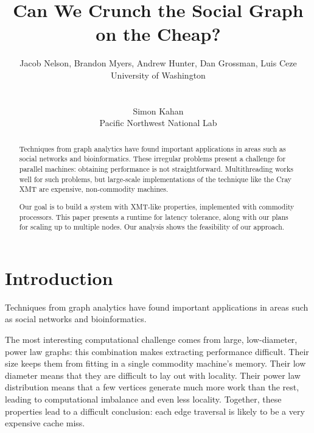 \documentclass{acm_proc_article-sp}
\begin{document}
\title{Can We Crunch the Social Graph on the Cheap?}

\author{
Jacob Nelson, Brandon Myers, Andrew Hunter, Dan Grossman, Luis Ceze\\
University of Washington\\
\\ \\
Simon Kahan \\ 
Pacific Northwest National Lab\\
}

\maketitle
\begin{abstract}

 Techniques from graph analytics have found important applications in
  areas such as social networks and bioinformatics. These irregular
  problems present a challenge for parallel machines: obtaining
  performance is not straightforward. Multithreading works well for
  such problems, but large-scale implementations of the technique like
  the Cray XMT are expensive, non-commodity machines.

  Our goal is to build a system with XMT-like properties, implemented
  with commodity processors. This paper presents a runtime for latency
  tolerance, along with our plans for scaling up to multiple
  nodes. Our analysis shows the feasibility of our approach.
\end{abstract}

\section{Introduction}


Techniques from graph analytics have found important applications in
areas such as social networks and bioinformatics. 



The most interesting computational challenge comes from large,
low-diameter, power law graphs: this combination makes extracting
performance difficult. Their size keeps them from fitting in a single
commodity machine's memory. Their low diameter means that they are
difficult to lay out with locality. Their power law distribution means
that a few vertices generate much more work than the rest, leading to
computational imbalance and even less locality. Together, these
properties lead to a difficult conclusion: each edge traversal is
likely to be a very expensive cache miss.
\end{document}
